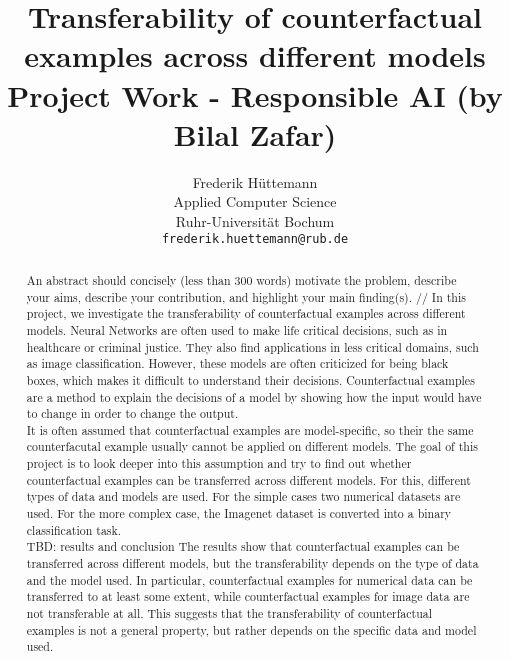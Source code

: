 \documentclass{article}
\title{
  Transferability of counterfactual examples across different models\\
  \vspace{1em}
  \small{\normalfont Project Work - Responsible AI (by Bilal Zafar)}
}
\author{
  Frederik Hüttemann \\
  Applied Computer Science\\
  Ruhr-Universität Bochum \\
  \texttt{frederik.huettemann@rub.de} \\
}
\begin{document}
\maketitle

\begin{abstract}
An abstract should concisely (less than 300 words) motivate the problem, describe your aims, describe your contribution, and highlight your main finding(s). //
In this project, we investigate the transferability of counterfactual examples across different models. Neural Networks are often used to make life critical decisions, such as in healthcare or criminal justice. They also find applications in less critical domains, such as image classification. However, these models are often criticized for being black boxes, which makes it difficult to understand their decisions. Counterfactual examples are a method to explain the decisions of a model by showing how the input would have to change in order to change the output. \\
It is often assumed that counterfactual examples are model-specific, so their the same counterfacutal example usually cannot be applied on different models. The goal of this project is to look deeper into this assumption and try to find out whether counterfactual examples can be transferred across different models. For this, different types of data and models are used. For the simple cases two numerical datasets are used. For the more complex case, the Imagenet dataset is converted into a binary classification task.\\
TBD: results and conclusion
The results show that counterfactual examples can be transferred across different models, but the transferability depends on the type of data and the model used. In particular, counterfactual examples for numerical data can be transferred to at least some extent, while counterfactual examples for image data are not transferable at all. This suggests that the transferability of counterfactual examples is not a general property, but rather depends on the specific data and model used.
\end{abstract}

\end{document}
